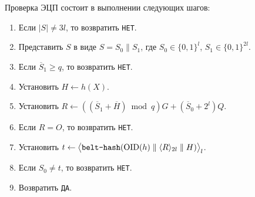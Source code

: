 Проверка ЭЦП состоит в выполнении следующих шагов:
\begin{enumerate}
\item
Если $|S|\neq 3l$,
то возвратить \texttt{НЕТ}.

\item
Представить $S$ в виде $S=S_0\parallel S_1$,
где $S_0\in\{0,1\}^{l}$, $S_1\in\{0,1\}^{2l}$.

\item
Если $\overline{S}_1\geq q$,
то возвратить \texttt{НЕТ}.

\item
Установить $H\leftarrow h(X)$.

\item
Установить
$R\leftarrow \left((\overline{S}_1+\overline{H})\bmod q\right)G+
(\overline{S}_0+2^{l})Q$.

\item
Если $R=O$, то возвратить \texttt{НЕТ}.

\item
Установить 
$t\leftarrow\bigl\langle
\texttt{belt-hash}
(\text{\normalfont OID}(h)\parallel\langle R\rangle_{2l}\parallel H)
\bigr\rangle_l$.

\item
Если $S_0\neq t$,
то возвратить \texttt{НЕТ}.

\item
Возвратить \texttt{ДА}.
\end{enumerate}
